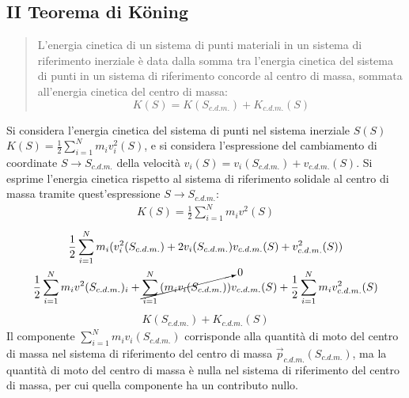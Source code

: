 \documentclass{article}
\numberwithin{equation}{subsection}
\begin{document}
\subsection{II Teorema di K\"{o}ning}
\begin{quotation}
    L'energia cinetica di un sistema di punti materiali in un 
    sistema di riferimento inerziale è data dalla somma tra 
    l'energia cinetica del sistema di punti in un sistema di 
    riferimento concorde al centro di massa, sommata all'energia 
    cinetica del centro di massa:
    \begin{equation}
        K(S)=K(S_{c.d.m.})+K_{c.d.m.}(S)
    \end{equation}
\end{quotation}

Si considera l'energia cinetica del sistema di punti nel sistema inerziale $S(S)$ \\
$K(S)=\displaystyle\frac{1}{2}\sum_{i=1}^{N}m_iv_i^{2}(S)$, e 
si considera l'espressione del cambiamento di coordinate $S\to S_{c.d.m.}$ della velocità $v_i(S)=v_i(S_{c.d.m.})+v_{c.d.m.}(S)$. Si esprime l'energia cinetica 
rispetto al sistema di riferimento solidale al centro di massa tramite quest'espressione $S\to S_{c.d.m.}$: 
\begin{gather*}
    K(S)=\displaystyle\frac{1}{2}\sum_{i=1}^{N}m_iv^{2}(S)
\end{gather*}
\begin{gather*}
    \displaystyle\frac{1}{2}\sum_{i=1}^{N}m_i(v^{2}_i(S_{c.d.m.})+2v_i(S_{c.d.m.}){v}_{c.d.m.}(S)+v_{c.d.m.}^{2}(S))\\
    \displaystyle\frac{1}{2}\displaystyle\sum_{i=1}^{N}m_iv^{2}(S_{c.d.m.})_i+\cancelto{0}{\displaystyle\sum_{i=1}^{N}\left(m_i{v}_i(S_{c.d.m.})\right)}{v}_{c.d.m.}(S)+\frac{1}{2}\displaystyle\sum_{i=1}^{N}m_iv_{c.d.m.}^{2}(S)
\end{gather*}
\begin{gather*}
    K(S_{c.d.m.})+K_{c.d.m.}(S)
\end{gather*}
Il componente $\displaystyle\sum_{i=1}^{N}m_i{v}_i(S_{c.d.m.})$ corrisponde alla quantità di moto del centro di massa nel sistema di riferimento del centro di massa $\vec{p}_{c.d.m.}(S_{c.d.m.})$, 
ma la quantità di moto del centro di massa è nulla nel sistema di riferimento del centro di massa, per cui quella componente ha un contributo nullo. 
\end{document}
